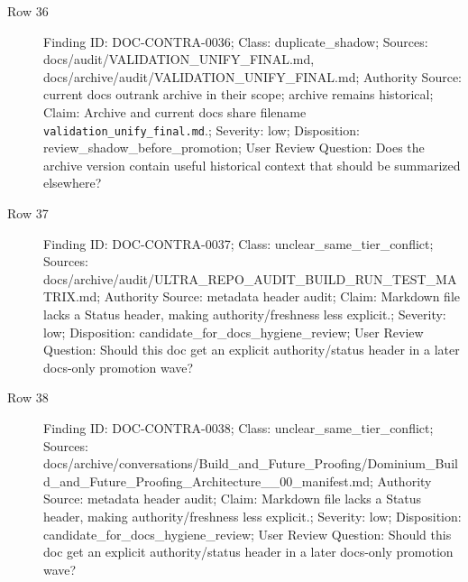 \documentclass[10.5pt,a4paper,openany]{book}
\begin{document}
\begin{description}
\item[Row 36] Finding ID: DOC-\allowbreak{}CONTRA-\allowbreak{}0036; Class: duplicate\_\allowbreak{}shadow; Sources: docs/\allowbreak{}audit/\allowbreak{}VALIDATION\_\allowbreak{}UNIFY\_\allowbreak{}FINAL.\allowbreak{}md, docs/\allowbreak{}archive/\allowbreak{}audit/\allowbreak{}VALIDATION\_\allowbreak{}UNIFY\_\allowbreak{}FINAL.\allowbreak{}md; Authority Source: current docs outrank archive in their scope; archive remains historical; Claim: Archive and current docs share filename \texttt{validation\_\allowbreak{}unify\_\allowbreak{}final.\allowbreak{}md}.\allowbreak{}; Severity: low; Disposition: review\_\allowbreak{}shadow\_\allowbreak{}before\_\allowbreak{}promotion; User Review Question: Does the archive version contain useful historical context that should be summarized elsewhere?
\item[Row 37] Finding ID: DOC-\allowbreak{}CONTRA-\allowbreak{}0037; Class: unclear\_\allowbreak{}same\_\allowbreak{}tier\_\allowbreak{}conflict; Sources: docs/\allowbreak{}archive/\allowbreak{}audit/\allowbreak{}ULTRA\_\allowbreak{}REPO\_\allowbreak{}AUDIT\_\allowbreak{}BUILD\_\allowbreak{}RUN\_\allowbreak{}TEST\_\allowbreak{}MATRIX.\allowbreak{}md; Authority Source: metadata header audit; Claim: Markdown file lacks a Status header, making authority/\allowbreak{}freshness less explicit.\allowbreak{}; Severity: low; Disposition: candidate\_\allowbreak{}for\_\allowbreak{}docs\_\allowbreak{}hygiene\_\allowbreak{}review; User Review Question: Should this doc get an explicit authority/\allowbreak{}status header in a later docs-\allowbreak{}only promotion wave?
\item[Row 38] Finding ID: DOC-\allowbreak{}CONTRA-\allowbreak{}0038; Class: unclear\_\allowbreak{}same\_\allowbreak{}tier\_\allowbreak{}conflict; Sources: docs/\allowbreak{}archive/\allowbreak{}conversations/\allowbreak{}Build\_\allowbreak{}and\_\allowbreak{}Future\_\allowbreak{}Proofing/\allowbreak{}Dominium\_\allowbreak{}Build\_\allowbreak{}and\_\allowbreak{}Future\_\allowbreak{}Proofing\_\allowbreak{}Architecture\_\allowbreak{}\_\allowbreak{}00\_\allowbreak{}manifest.\allowbreak{}md; Authority Source: metadata header audit; Claim: Markdown file lacks a Status header, making authority/\allowbreak{}freshness less explicit.\allowbreak{}; Severity: low; Disposition: candidate\_\allowbreak{}for\_\allowbreak{}docs\_\allowbreak{}hygiene\_\allowbreak{}review; User Review Question: Should this doc get an explicit authority/\allowbreak{}status header in a later docs-\allowbreak{}only promotion wave?

\end{description}
\end{document}
